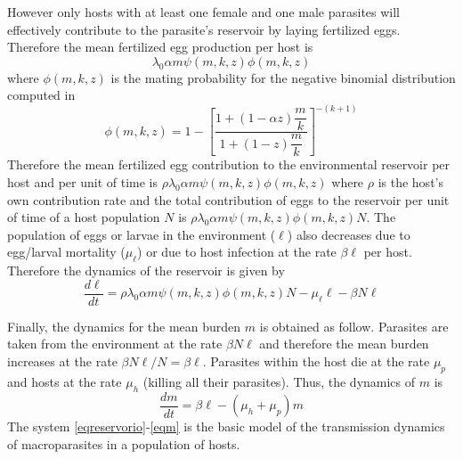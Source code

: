 \documentclass[eng]{MMSB-class-eng}
\begin{document}
However only hosts with at least one female and one male parasites will effectively contribute to the parasite's reservoir by laying fertilized eggs. Therefore the mean fertilized egg production per host is 
\begin{equation}\label{meanfertilizedeggs}
\lambda_0
\alpha m
\psi(m,k,z)\phi(m,k,z)
\end{equation} 
where $\phi(m,k,z)$ is the mating probability for the negative binomial distribution computed in \citep{lopez2022general}
\begin{equation}
\phi(m,k,z)=1-\left[ \frac{1+ \left( 1-
	\alpha z
	\right) \dfrac{m}{k}}{1+(1-z)\dfrac{m}{k}}\right] ^{-(k+1)}
\end{equation}
Therefore the mean fertilized egg contribution to the environmental reservoir  per host and per unit of time is
$\rho\lambda_0
\alpha m
\psi(m,k,z) \phi(m,k,z)$ where $\rho$ 
is the host's own contribution rate and the total contribution of eggs to the reservoir per unit of time of a host population $N$ is 
$\rho\lambda_0
\alpha m
\psi(m,k,z) \phi(m,k,z) N$. 
The population of eggs or larvae in the environment ($\ell$) also decreases due to egg/larval mortality ($\mu_{\ell}$) or due to host infection at the rate $\beta \ell$ per host. 
Therefore the dynamics of the reservoir is given by
\begin{equation}\label{eqreservorio}
\dfrac{d\ell}{dt}= \rho\lambda_0
\alpha m
\psi(m,k,z) \phi(m,k,z) N- \mu_{\ell} \ell -\beta N \ell 
\end{equation}

Finally, the dynamics for the mean burden $m$ is obtained as follow. Parasites are taken from the environment at the rate 	$\beta N \ell $ and therefore the mean burden increases at the rate  $\beta  N\ell/N=\beta\ell $. Parasites within the host die at the rate $\mu_p$ and hosts at the rate $\mu_h$ (killing all their parasites). Thus, the dynamics of $m$ is
\begin{equation}\label{eqm}
\dfrac{dm}{dt}=\beta \ell - (\mu_h+\mu_p)m
\end{equation}
The system \eqref{eqreservorio}-\eqref{eqm} is the basic model of the transmission dynamics of macroparasites in a population of hosts. 
\end{document}
